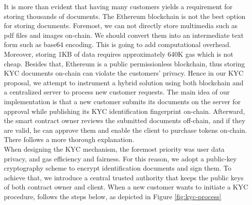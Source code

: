 \documentclass[12pt,a4paper]{article}
\begin{document}
It is more than evident that having many customers yields a requirement for
storing thousands of documents. The Ethereum blockchain is not the best option
for storing documents. Foremost, we can not directly store multimedia such as
pdf files and images on-chain. We should convert them into an intermediate text
form such as base64 encoding. This is going to add computational overhead.
Moreover, storing 1KB of data requires approximately 640K gas which is not
cheap. Besides that, Ethereum is a public permissionless blockchain, thus
storing KYC documents on-chain can violate the customers' privacy. Hence in our
KYC  proposal, we attempt to instrument a hybrid solution using both blockchain
and a centralized server to process new customer requests. The main idea of our
implementation is that a new customer submits its documents on the server for
approval while publishing its KYC identification fingerprint on-chain.
Afterward, the smart contract owner reviews the submitted documents off-chain,
and if they are valid, he can approve them and enable the client to purchase
tokens on-chain. There follows a more thorough explanation. \\


When designing the KYC mechanism, the foremost priority was user data privacy,
and gas efficiency and fairness. For this reason, we adopt a public-key
cryptography scheme to encrypt identification documents and sign them. To
achieve that, we introduce a central trusted authority that keeps the public
keys of both contract owner and client. When a new customer wants to initiate a
KYC procedure, follows the steps below, as depicted in Figure \ref{fig:kyc-process}
\end{document}
